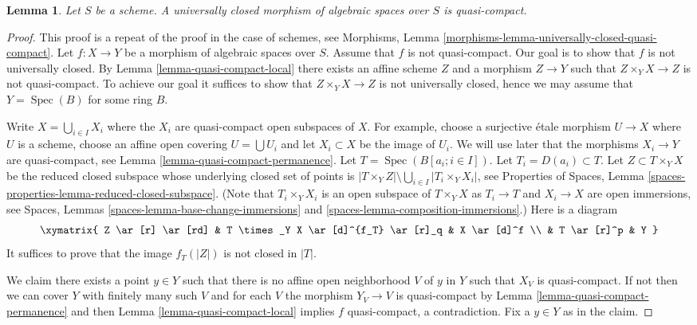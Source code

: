 \documentclass{stacks-project}
\theoremstyle{plain}
\newtheorem{lemma}[subsection]{Lemma}
\theoremstyle{definition}
\theoremstyle{remark}
\numberwithin{equation}{subsection}
\def\Spec{\mathop{\mathrm{Spec}}}
\begin{document}
\begin{lemma}
\label{lemma-universally-closed-quasi-compact}
Let $S$ be a scheme.
A universally closed morphism of algebraic spaces over $S$ is quasi-compact.
\end{lemma}

\begin{proof}
This proof is a repeat of the proof in the case of schemes, see
Morphisms, Lemma \ref{morphisms-lemma-universally-closed-quasi-compact}.
Let $f : X \to Y$ be a morphism of algebraic spaces over $S$.
Assume that $f$ is not quasi-compact.
Our goal is to show that $f$ is not universally closed. By
Lemma \ref{lemma-quasi-compact-local}
there exists an affine scheme $Z$ and a morphism $Z \to Y$
such that $Z \times_Y X \to Z$ is not quasi-compact. To achieve our goal
it suffices to show that $Z \times_Y X \to Z$ is not universally closed,
hence we may assume that $Y = \Spec(B)$ for some ring $B$.

\medskip\noindent
Write $X = \bigcup_{i \in I} X_i$ where the $X_i$ are quasi-compact
open subspaces of $X$. For example, choose a surjective \'etale morphism
$U \to X$ where $U$ is a scheme, choose an affine open covering
$U = \bigcup U_i$ and let $X_i \subset X$ be the image of $U_i$.
We will use later that the morphisms $X_i \to Y$ are quasi-compact, see
Lemma \ref{lemma-quasi-compact-permanence}.
Let $T = \Spec(B[a_i ; i \in I])$. Let $T_i = D(a_i) \subset T$.
Let $Z \subset T \times_Y X$ be the reduced closed subspace whose underlying
closed set of points is
$|T \times_Y Z| \setminus \bigcup_{i \in I} |T_i \times_Y X_i|$, see
Properties of Spaces,
Lemma \ref{spaces-properties-lemma-reduced-closed-subspace}.
(Note that $T_i \times_Y X_i$ is an open subspace of $T \times_Y X$ as
$T_i \to T$ and $X_i \to X$ are open immersions, see
Spaces, Lemmas \ref{spaces-lemma-base-change-immersions} and
\ref{spaces-lemma-composition-immersions}.) Here is a diagram
$$
\xymatrix{
Z \ar[r] \ar[rd] &
T \times_Y X \ar[d]^{f_T} \ar[r]_q &
X \ar[d]^f \\
& T \ar[r]^p & Y
}
$$
It suffices to prove that the image $f_T(|Z|)$ is not closed in $|T|$.

\medskip\noindent
We claim there exists a point $y \in Y$ such that there is no
affine open neighborhood $V$ of $y$ in $Y$ such that $X_V$ is quasi-compact.
If not then we can cover $Y$ with finitely many such $V$ and for
each $V$ the morphism $Y_V \to V$ is quasi-compact by
Lemma \ref{lemma-quasi-compact-permanence}
and then
Lemma \ref{lemma-quasi-compact-local}
implies $f$ quasi-compact, a contradiction. Fix a $y \in Y$ as in the claim.


\end{proof}
\end{document}
